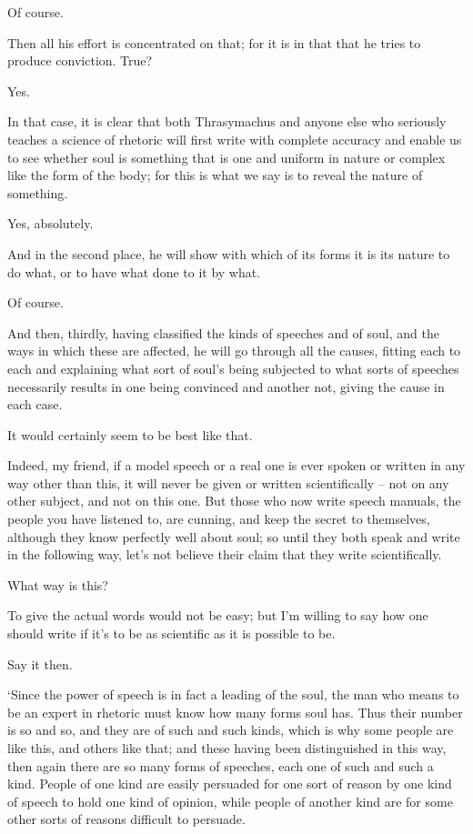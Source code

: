 Of course.

Then all his effort is concentrated on that; for it is
 in that that he tries to produce conviction. True?

Yes.

In that case, it is clear that both Thrasymachus and anyone
else who seriously teaches a science of rhetoric will first 
write with complete accuracy and enable us to see whether soul is
something that is one and uniform in nature or complex like the form of
the body; for this is what we say is to reveal the nature of something.

Yes, absolutely.

And in the second place, he will show with which  of
its forms it is its nature to do what, or to have what done to it by
what.

Of course.

And then, thirdly, having classified the
kinds of 
speeches and of soul, and the ways in which these are affected, he will
go through all the causes, fitting each to each and explaining what sort
of soul's being subjected to what sorts of speeches necessarily results
in one being convinced and another not, giving the cause in each case.


It would certainly seem to be best like that.

Indeed, my friend, if a model
speech or a real one is
ever spoken or written in any way other than this, it will never be
given or written scientifically -- not on any other  subject,
and not on this one. But
those who now write speech manuals, the people you have listened to, are
cunning, and keep the secret to themselves, although they know perfectly
well about soul; so until they both speak and write in the following
way, let's not believe their claim that they write scientifically.

What way is this? 

To give the actual words would not be easy; but I'm willing to
say how one should write
if it's to be as scientific as it is possible to be.

Say it then.

 ‘Since the power of speech is in fact a leading of
the soul,  the man who means to be an expert in rhetoric must
know how many forms soul has. Thus their number is so and so, and they
are of such and such kinds, which is why some people are like this, and
others like that; and these having been distinguished in this way, then
again there are so many forms of  speeches, each one of such and
such a kind. People of one kind are easily persuaded for one sort of
reason by one kind of speech to hold one kind of opinion, while people
of another kind are for some other sorts of reasons difficult to
persuade.

